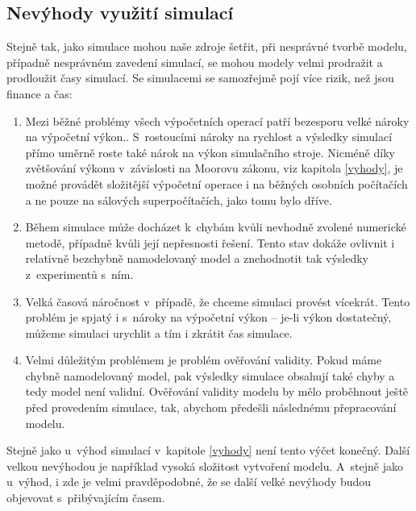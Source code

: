 \subsection{Nevýhody využití simulací}

Stejně tak, jako simulace mohou naše zdroje šetřit, při nesprávné tvorbě modelu, případně nesprávném zavedení simulací, se mohou modely velmi prodražit a prodloužit časy simulací. Se simulacemi se samozřejmě pojí více rizik, než jsou finance a čas:

\begin{enumerate}
    \item Mezi běžné problémy všech výpočetních operací patří bezesporu velké nároky na výpočetní výkon.. S~rostoucími nároky na rychlost a výsledky simulací přímo uměrně roste také nárok na výkon simulačního stroje. Nicméně díky zvětšování výkonu v~závislosti na Moorovu zákonu, viz kapitola \ref{vyhody}, je možné provádět složitější výpočetní operace i na běžných osobních počítačích a ne pouze na sálových superpočítačích, jako tomu bylo dříve.
    \item Během simulace může docházet k~chybám kvůli nevhodně zvolené numerické metodě, případně kvůli její nepřesnosti řešení. Tento stav dokáže ovlivnit i relativně bezchybně namodelovaný model a znehodnotit tak výsledky z~experimentů s~ním.
    \item Velká časová náročnost v~případě, že chceme simulaci provést vícekrát. Tento problém je spjatý i s~nároky na výpočetní výkon -- je-li výkon dostatečný, můžeme simulaci urychlit a tím i zkrátit čas simulace.
    \item Velmi důležitým problémem je problém ověřování validity. Pokud máme chybně namodelovaný model, pak výsledky simulace obsahují také chyby a tedy model není validní. Ověřování validity modelu by mělo proběhnout ještě před provedením simulace, tak, abychom předešli následnému přepracování modelu.
\end{enumerate}

Stejně jako u~výhod simulací v~kapitole \ref{vyhody} není tento výčet konečný. Další velkou nevýhodou je například vysoká složitost vytvoření modelu. A~stejně jako u~výhod, i zde je velmi pravděpodobné, že se další velké nevýhody budou objevovat s~přibývajícím časem.

